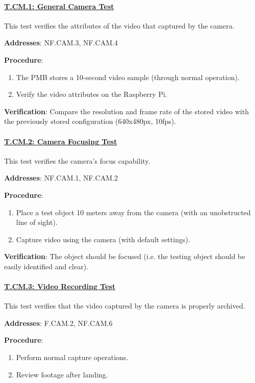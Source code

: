\paragraph{\underline{T.CM.1: General Camera Test}}

This test verifies the attributes of the video that captured by the camera.

\textbf{Addresses}: NF.CAM.3, NF.CAM.4

\textbf{Procedure}:
\begin{enumerate}[noitemsep]
    \item The PMB stores a 10-second video sample (through normal operation).
    \item Verify the video attributes on the Raspberry Pi.
\end{enumerate}

\textbf{Verification}: 
Compare the resolution and frame rate of the stored video with the previously stored configuration (640x480px, 10fps).

%

\paragraph{\underline{T.CM.2: Camera Focusing Test}}

This test verifies the camera's focus capability.

\textbf{Addresses}: NF.CAM.1, NF.CAM.2

\textbf{Procedure}:
\begin{enumerate}[noitemsep]
    \item Place a test object 10 meters away from the camera (with an unobstructed line of sight).
    \item Capture video using the camera (with default settings).
\end{enumerate}

\textbf{Verification}: 
The object should be focused (i.e. the testing object should be easily identified and clear).

%

\paragraph{\underline{T.CM.3: Video Recording Test}}

This test verifies that the video captured by the camera is properly archived.

\textbf{Addresses}: F.CAM.2, NF.CAM.6

\textbf{Procedure}:
\begin{enumerate}[noitemsep]
    \item Perform normal capture operations.
    \item Review footage after landing.
\end{enumerate}

